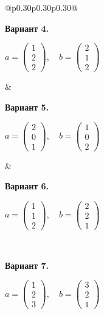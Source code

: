 \documentclass[12pt,a4paper]{article}
\begin{document}
{\begin{longtable}{@{}p{0.30\textwidth}p{0.30\textwidth}p{0.30\textwidth}@{}}
\begin{minipage}[t]{\linewidth}\vspace{0pt}\raggedright\setlength{\parskip}{0pt}
\textbf{Вариант 4.}\par\smallskip
\(\displaystyle  a=\begin{pmatrix}1\\2\\2\end{pmatrix},\quad b=\begin{pmatrix}2\\1\\2\end{pmatrix}\)\par
\end{minipage} &
\begin{minipage}[t]{\linewidth}\vspace{0pt}\raggedright\setlength{\parskip}{0pt}
\textbf{Вариант 5.}\par\smallskip
\(\displaystyle  a=\begin{pmatrix}2\\0\\1\end{pmatrix},\quad b=\begin{pmatrix}1\\0\\2\end{pmatrix}\)\par
\end{minipage} &
\begin{minipage}[t]{\linewidth}\vspace{0pt}\raggedright\setlength{\parskip}{0pt}
\textbf{Вариант 6.}\par\smallskip
\(\displaystyle  a=\begin{pmatrix}1\\1\\2\end{pmatrix},\quad b=\begin{pmatrix}2\\2\\1\end{pmatrix}\)\par
\end{minipage}\\\noalign{\vskip 14pt}
\begin{minipage}[t]{\linewidth}\vspace{0pt}\raggedright\setlength{\parskip}{0pt}
\textbf{Вариант 7.}\par\smallskip
\(\displaystyle  a=\begin{pmatrix}1\\2\\3\end{pmatrix},\quad b=\begin{pmatrix}3\\2\\1\end{pmatrix}\)\par

\end{minipage}
\end{longtable}}
\end{document}
